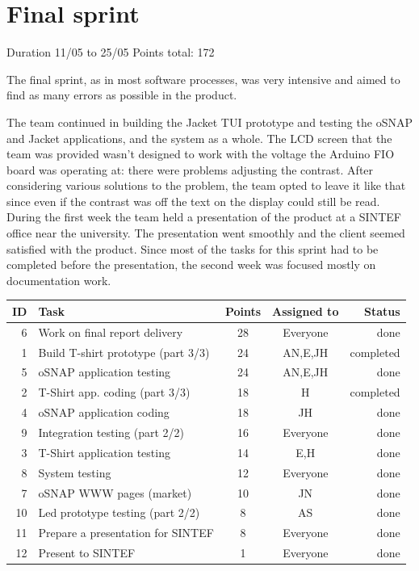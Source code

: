 \newpage

\section{Final sprint}

Duration 11/05 to 25/05\newline
Points total: 172

The final sprint, as in most software processes, was very intensive and aimed
to find as many errors as possible in the product.

The team continued in building the Jacket TUI prototype and testing
the oSNAP and Jacket applications, and the system as a whole.
The LCD screen that the team was provided wasn't designed to work with the
voltage the Arduino FIO board was operating at: there were problems adjusting
the contrast. After considering various solutions to the problem, the team
opted to leave it like that since even if the contrast was off the text on the
display could still be read. During the first week the team held a presentation
of the product at a SINTEF office near the university. The presentation went
smoothly and the client seemed satisfied with the product. Since most of the
tasks for this sprint had to be completed before the presentation, the second
week was focused mostly on documentation work.


\begin{table}[ht!]
\begin{tabular}{ | r | l | c | c | r | }

\hline
\textbf{ID} & \textbf{Task} & \textbf{Points} & \textbf{Assigned to} & \textbf{Status} \\
\hline

 6 & Work on final report delivery				& 28 & Everyone	& done \\
\hline
 1 & Build T-shirt prototype (part 3/3)			& 24 & AN,E,JH	& completed \\
\hline
 5 & oSNAP application testing					& 24 & AN,E,JH	& done \\
\hline
 2 & T-Shirt app. coding (part 3/3)				& 18 & H		& completed \\
\hline
 4 & oSNAP application coding					& 18 & JH		& done \\
\hline
 9 & Integration testing (part 2/2)				& 16 & Everyone	& done \\
\hline
 3 & T-Shirt application testing 				& 14 & E,H		& done \\
\hline
 8 & System testing								& 12 & Everyone	& done \\
\hline
 7 & oSNAP WWW pages (market)					& 10 & JN		& done \\
\hline
10 & Led prototype testing (part 2/2)			& 8  & AS		& done \\
\hline
11 & Prepare a presentation for SINTEF & 8  & Everyone       & done \\
\hline
12 & Present to SINTEF & 1  & Everyone       & done \\
\hline

\end{tabular}
\end{table}


